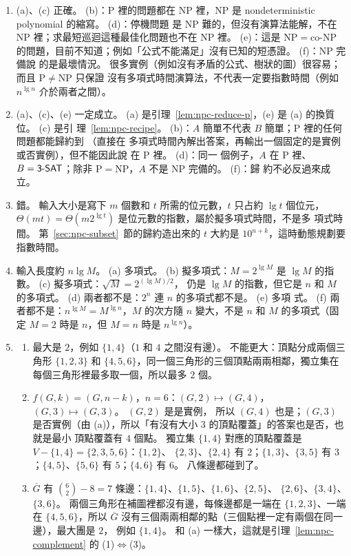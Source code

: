 \begin{enumerate}
\item (a)、(c) 正確。 (b)：P 裡的問題都在 NP 裡，NP 是 nondeterministic polynomial 的縮寫。 (d)：停機問題
是 NP 難的，但沒有演算法能解，不在 NP 裡；求最短巡迴這種最佳化問題也不在 NP 裡。 (e)：這是
$\mathrm{NP} = \text{co-NP}$ 的問題，目前不知道；例如「公式不能滿足」沒有已知的短憑證。 (f)：NP 完備說
的是最壞情況。 很多實例（例如沒有矛盾的公式、樹狀的圖）很容易；而且 $\mathrm{P} \ne \mathrm{NP}$ 只保證
沒有多項式時間演算法，不代表一定要指數時間（例如 $n^{\lg n}$ 介於兩者之間）。

\item (a)、(c)、(e) 一定成立。 (a) 是引理~\ref{lem:npc-reduce-p}，(e) 是 (a) 的換質位。 (c) 是引
理~\ref{lem:npc-recipe}。 (b)：$A$ 簡單不代表 $B$ 簡單；P 裡的任何問題都能歸約到 （直接在
多項式時間內解出答案，再輸出一個固定的是實例或否實例），但不能因此說  在 P 裡。 (d)：同一
個例子，$A$ 在 P 裡、$B = \textsf{3-SAT}$；除非 $\mathrm{P} = \mathrm{NP}$，$A$ 不是 NP 完備的。 (f)：歸
約不必反過來成立。

\item 錯。 輸入大小是寫下 $m$ 個數和 $t$ 所需的位元數，$t$ 只占約 $\lg t$ 個位元，$\Theta(mt) = \Theta(m 2^{\lg t})$ 是位元數的指數，屬於擬多項式時間，不是多
項式時間。 第~\ref{sec:npc-subset}~節的歸約造出來的 $t$ 大約是 $10^{n+k}$，這時動態規劃要指數時間。

\item 輸入長度約 $n \lg M$。
(a) 多項式。 (b) 擬多項式：$M = 2^{\lg M}$ 是 $\lg M$ 的指數。 (c) 擬多項式：$\sqrt{M} = 2^{(\lg M)/2}$，
仍是 $\lg M$ 的指數，但它是 $n$ 和 $M$ 的多項式。 (d) 兩者都不是：$2^n$ 連 $n$ 的多項式都不是。 (e) 多項
式。 (f) 兩者都不是：$n^{\lg M} = M^{\lg n}$，$M$ 的次方隨 $n$ 變大，不是 $n$ 和 $M$ 的多項式（固定
$M = 2$ 時是 $n$，但 $M = n$ 時是 $n^{\lg n}$）。

\item
\begin{enumerate}
\item 最大是 $2$，例如 $\{1, 4\}$（$1$ 和 $4$ 之間沒有邊）。 不能更大：頂點分成兩個三角形 $\{1, 2, 3\}$
和 $\{4, 5, 6\}$，同一個三角形的三個頂點兩兩相鄰，獨立集在每個三角形裡最多取一個，所以最多 $2$ 個。
\item $f(G, k) = (G, n - k)$，$n = 6$：$(G, 2) \mapsto (G, 4)$，$(G, 3) \mapsto (G, 3)$。 $(G, 2)$ 是是實例，
所以 $(G, 4)$ 也是；$(G, 3)$ 是否實例（由 (a)），所以「有沒有大小 $3$ 的頂點覆蓋」的答案也是否，也就是最小
頂點覆蓋有 $4$ 個點。 獨立集 $\{1, 4\}$ 對應的頂點覆蓋是 $V - \{1, 4\} = \{2, 3, 5, 6\}$：$\{1, 2\}$、
$\{2, 3\}$、$\{2, 4\}$ 有 $2$；$\{1, 3\}$、$\{3, 5\}$ 有 $3$；$\{4, 5\}$、$\{5, 6\}$ 有 $5$；$\{4, 6\}$ 有
$6$。 八條邊都碰到了。
\item $\overline{G}$ 有 $\binom{6}{2} - 8 = 7$ 條邊：$\{1, 4\}$、$\{1, 5\}$、$\{1, 6\}$、$\{2, 5\}$、
$\{2, 6\}$、$\{3, 4\}$、$\{3, 6\}$。 兩個三角形在補圖裡都沒有邊，每條邊都是一端在 $\{1, 2, 3\}$、一端在
$\{4, 5, 6\}$，所以 $\overline{G}$ 沒有三個兩兩相鄰的點（三個點裡一定有兩個在同一邊），最大團是 $2$，
例如 $\{1, 4\}$。 和 (a) 一樣大，這就是引理~\ref{lem:npc-complement} 的 (1)$\iff$(3)。
\end{enumerate}


\end{enumerate}
